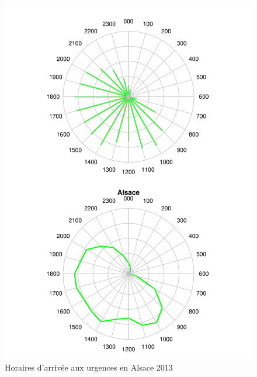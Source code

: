 \documentclass[12pt,english,french,twoside]{report}\usepackage[]{graphicx}\usepackage[]{color}
\makeatletter
\def\maxwidth{ %
  \ifdim\Gin@nat@width>\linewidth
    \linewidth
  \else
    \Gin@nat@width
  \fi
}
\newenvironment{knitrout}{}{} %
\makeatother
\begin{document}
\begin{figure}
\begin{center}
\begin{knitrout}
\color{fgcolor}
\includegraphics[width=\maxwidth]{figure/test25} 

\end{knitrout}

\end{center}
\caption{Horaires d'arrivée aux urgences en Alsace 2013}
\label{radar:als}
\end{figure}
\end{document}
